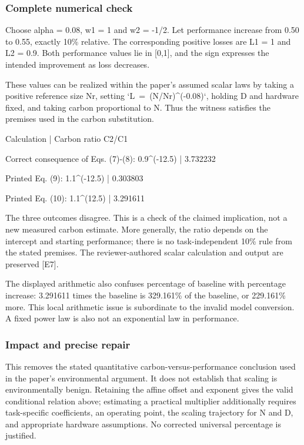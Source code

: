 \documentclass[10pt]{article}
\begin{document}
\subsubsection*{Complete numerical check}
Choose alpha = 0.08, w1 = 1 and w2 = -1/2. Let performance increase from 0.50 to 0.55, exactly 10\% relative. The corresponding positive losses are L1 = 1 and L2 = 0.9. Both performance values lie in [0,1], and the sign expresses the intended improvement as loss decreases.\par
These values can be realized within the paper’s assumed scalar laws by taking a positive reference size Nr, setting `L = (N/Nr)\textasciicircum{}(-0.08)`, holding D and hardware fixed, and taking carbon proportional to N. Thus the witness satisfies the premises used in the carbon substitution.\par
Calculation | Carbon ratio C2/C1\par
Correct consequence of Eqs. (7)-(8): 0.9\textasciicircum{}(-12.5) | 3.732232\par
Printed Eq. (9): 1.1\textasciicircum{}(-12.5) | 0.303803\par
Printed Eq. (10): 1.1\textasciicircum{}(12.5) | 3.291611\par
The three outcomes disagree. This is a check of the claimed implication, not a new measured carbon estimate. More generally, the ratio depends on the intercept and starting performance; there is no task-independent 10\% rule from the stated premises. The reviewer-authored scalar calculation and output are preserved [E7].\par
The displayed arithmetic also confuses percentage of baseline with percentage increase: 3.291611 times the baseline is 329.161\% of the baseline, or 229.161\% more. This local arithmetic issue is subordinate to the invalid model conversion. A fixed power law is also not an exponential law in performance.\par
\subsubsection*{Impact and precise repair}
This removes the stated quantitative carbon-versus-performance conclusion used in the paper’s environmental argument. It does not establish that scaling is environmentally benign. Retaining the affine offset and exponent gives the valid conditional relation above; estimating a practical multiplier additionally requires task-specific coefficients, an operating point, the scaling trajectory for N and D, and appropriate hardware assumptions. No corrected universal percentage is justified.\par
\end{document}
